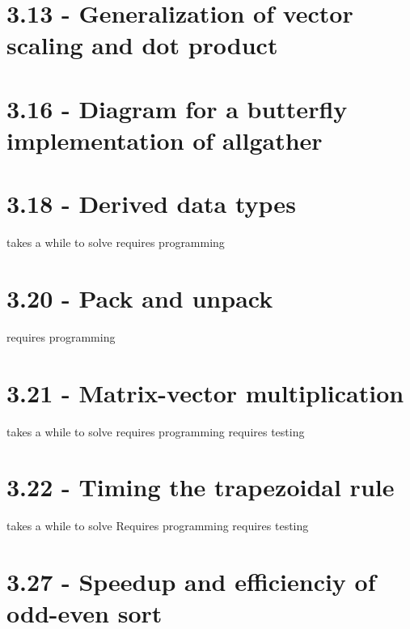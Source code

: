 \documentclass[a4paper,11pt,twoside]{article}
\begin{document}
\section{3.13 - Generalization of vector scaling and dot product}

\section{3.16 - Diagram for a butterfly implementation of allgather}

\section{3.18 - Derived data types}
takes a while to solve
requires programming

\section{3.20 - Pack and unpack}
requires programming


\section{3.21 - Matrix-vector multiplication}
takes a while to solve
requires programming
requires testing

\section{3.22 - Timing the trapezoidal rule}
takes a while to solve
Requires programming
requires testing

\section{3.27 - Speedup and efficienciy of odd-even sort}



\end{document}
